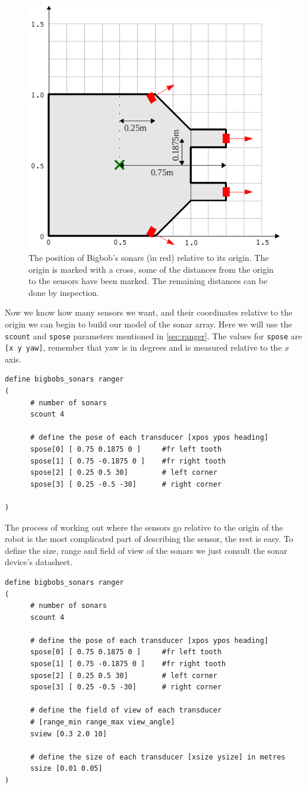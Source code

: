 \documentclass[a4paper]{report}
\begin{document}
\begin{figure}
	\centering
	\includegraphics[width=0.6\linewidth]{./pics/robot_building/bigbob_sonars.png} 
	\caption{The position of Bigbob's sonars (in red) relative to its origin. The origin is marked with a cross, some of the distances from the origin to the sensors have been marked. The remaining distances can be done by inspection.}
	\label{fig:sonardrawing}
\end{figure}

Now we know how many sensors we want, and their coordinates relative to the origin we can begin to build our model of the sonar array. Here we will use the \verb|scount| and \verb|spose| parameters mentioned in \ref{sec:ranger}. The values for \verb|spose| are \verb|[x y yaw]|, remember that yaw is in degrees and is measured relative to the $x$ axis.
\begin{verbatim}
define bigbobs_sonars ranger
(
      # number of sonars
      scount 4

      # define the pose of each transducer [xpos ypos heading]
      spose[0] [ 0.75 0.1875 0 ]     #fr left tooth
      spose[1] [ 0.75 -0.1875 0 ]    #fr right tooth
      spose[2] [ 0.25 0.5 30]        # left corner
      spose[3] [ 0.25 -0.5 -30]      # right corner

)
\end{verbatim}

The process of working out where the sensors go relative to the origin of the robot is the most complicated part of describing the sensor, the rest is easy. To define the size, range and field of view of the sonars we just consult the sonar device's datasheet.
\begin{verbatim}
define bigbobs_sonars ranger
(
      # number of sonars
      scount 4

      # define the pose of each transducer [xpos ypos heading]
      spose[0] [ 0.75 0.1875 0 ]     #fr left tooth
      spose[1] [ 0.75 -0.1875 0 ]    #fr right tooth
      spose[2] [ 0.25 0.5 30]        # left corner
      spose[3] [ 0.25 -0.5 -30]      # right corner
      
      # define the field of view of each transducer 
      # [range_min range_max view_angle]
      sview [0.3 2.0 10]

      # define the size of each transducer [xsize ysize] in metres
      ssize [0.01 0.05]
)
\end{verbatim}
\end{document}
